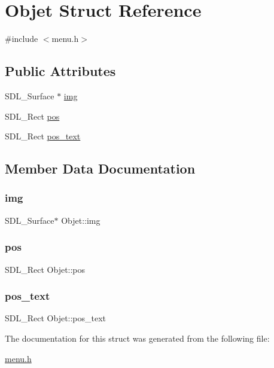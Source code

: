 \hypertarget{structObjet}{}\section{Objet Struct Reference}
\label{structObjet}


{\ttfamily \#include $<$menu.\+h$>$}

\subsection*{Public Attributes}
\begin{DoxyCompactItemize}
\item 
S\+D\+L\+\_\+\+Surface $\ast$ \hyperlink{structObjet_a0dac95199f82a456854968bfe257a14e}{img}
\item 
S\+D\+L\+\_\+\+Rect \hyperlink{structObjet_aa96c8e462a0637c98ab3c192e7f1806a}{pos}
\item 
S\+D\+L\+\_\+\+Rect \hyperlink{structObjet_a22b5f8635c29778f8a669585ec6ed6fd}{pos\+\_\+text}
\end{DoxyCompactItemize}


\subsection{Member Data Documentation}
\mbox{\label{structObjet_a0dac95199f82a456854968bfe257a14e}} 
\subsubsection{\texorpdfstring{img}{img}}
{\footnotesize\ttfamily S\+D\+L\+\_\+\+Surface$\ast$ Objet\+::img}

\mbox{\label{structObjet_aa96c8e462a0637c98ab3c192e7f1806a}} 
\subsubsection{\texorpdfstring{pos}{pos}}
{\footnotesize\ttfamily S\+D\+L\+\_\+\+Rect Objet\+::pos}

\mbox{\label{structObjet_a22b5f8635c29778f8a669585ec6ed6fd}} 
\subsubsection{\texorpdfstring{pos\+\_\+text}{pos\_text}}
{\footnotesize\ttfamily S\+D\+L\+\_\+\+Rect Objet\+::pos\+\_\+text}



The documentation for this struct was generated from the following file\+:\begin{DoxyCompactItemize}
\item 
\hyperlink{menu_8h}{menu.\+h}\end{DoxyCompactItemize}
